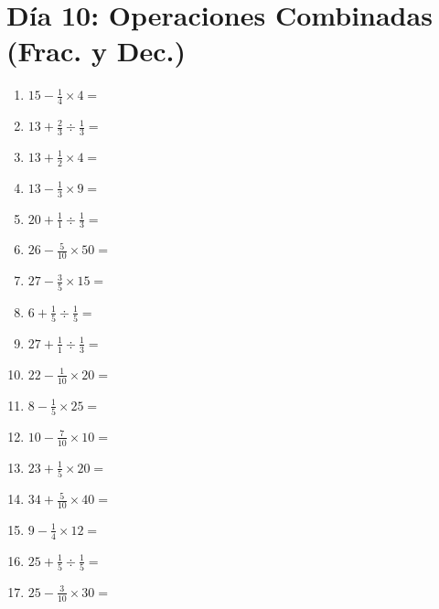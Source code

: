 \documentclass[12pt]{article}
\begin{document}
\section*{Día 10: Operaciones Combinadas (Frac. y Dec.)}
\begin{enumerate}
\item \large $ 15 - \frac{1}{4} \times 4 = $ \vspace{1.6cm}
\item \large $ 13 + \frac{2}{3} \div \frac{1}{3} = $ \vspace{1.6cm}
\item \large $ 13 + \frac{1}{2} \times 4 = $ \vspace{1.6cm}
\item \large $ 13 - \frac{1}{3} \times 9 = $ \vspace{1.6cm}
\item \large $ 20 + \frac{1}{1} \div \frac{1}{3} = $ \vspace{1.6cm}
\item \large $ 26 - \frac{5}{10} \times 50 = $ \vspace{1.6cm}
\item \large $ 27 - \frac{3}{5} \times 15 = $ \vspace{1.6cm}
\item \large $ 6 + \frac{1}{5} \div \frac{1}{5} = $ \vspace{1.6cm}
\item \large $ 27 + \frac{1}{1} \div \frac{1}{3} = $ \vspace{1.6cm}
\item \large $ 22 - \frac{1}{10} \times 20 = $ \vspace{1.6cm}
\newpage
\item \large $ 8 - \frac{1}{5} \times 25 = $ \vspace{1.6cm}
\item \large $ 10 - \frac{7}{10} \times 10 = $ \vspace{1.6cm}
\item \large $ 23 + \frac{1}{5} \times 20 = $ \vspace{1.6cm}
\item \large $ 34 + \frac{5}{10} \times 40 = $ \vspace{1.6cm}
\item \large $ 9 - \frac{1}{4} \times 12 = $ \vspace{1.6cm}
\item \large $ 25 + \frac{1}{5} \div \frac{1}{5} = $ \vspace{1.6cm}
\item \large $ 25 - \frac{3}{10} \times 30 = $ \vspace{1.6cm}

\end{enumerate}
\end{document}
